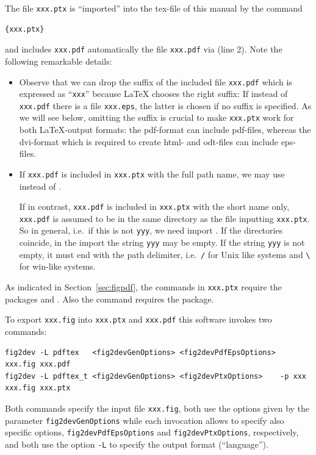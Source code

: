 The file \texttt{xxx.ptx} is ``imported'' into the tex-file of this manual 
by the command 
%
\begin{lstlisting}[language=TeX]
{xxx.ptx}
\end{lstlisting}
and includes \texttt{xxx.pdf} automatically the file \texttt{xxx.pdf} 
via  (line 2). 
Note the following remarkable details: 
%
\begin{itemize}
\item
Observe that we can drop the suffix of the included file \texttt{xxx.pdf} 
which is expressed as ``\texttt{xxx}'' 
because \LaTeX{} chooses the right suffix: 
If instead of \texttt{xxx.pdf} there is a file \texttt{xxx.eps}, 
the latter is chosen if no suffix is specified. 
As we will see below, 
omitting the suffix is crucial to make \texttt{xxx.ptx} work 
for both \LaTeX-output formats: 
the pdf-format can include pdf-files, 
whereas the dvi-format which is required to create html- and
odt-files can include eps-files. 
\item
If \texttt{xxx.pdf} is included in \texttt{xxx.ptx} 
with the full path name, 
we may use  instead of . 

If in contrast, \texttt{xxx.pdf} is included in \texttt{xxx.ptx} 
with the short name only, 
\texttt{xxx.pdf} is assumed to be in the same directory 
as the file inputting \texttt{xxx.ptx}. 
So in general, i.e.~if this is not \texttt{yyy}, we need import 
. 
If the directories coincide, 
in the import the string \texttt{yyy} may be empty. 
If the string \texttt{yyy} is not empty, it must end with the path delimiter, 
i.e.~\texttt/ for Unix like systems and 
\texttt{\textbackslash} for win-like systems. 
\end{itemize}

As indicated in Section~\ref{sec:figpdf}, 
the commands in \texttt{xxx.ptx} 
require the packages  and . 
Also the  command 
requires the  package. 

To export \texttt{xxx.fig} into \texttt{xxx.ptx} and \texttt{xxx.pdf} 
this software invokes two commands: 
%
\begin{Verbatim}[fontsize=\scriptsize]
fig2dev -L pdftex   <fig2devGenOptions> <fig2devPdfEpsOptions>        xxx.fig xxx.pdf   
fig2dev -L pdftex_t <fig2devGenOptions> <fig2devPtxOptions>    -p xxx xxx.fig xxx.ptx
\end{Verbatim}
%
Both commands specify the input file \texttt{xxx.fig}, 
both use the options given by the parameter \texttt{fig2devGenOptions} 
while each invocation allows to specify also specific options, 
\texttt{fig2devPdfEpsOptions} and \texttt{fig2devPtxOptions}, respectively, 
and both use the option \texttt{-L} 
to specify the output format (``language''). 

